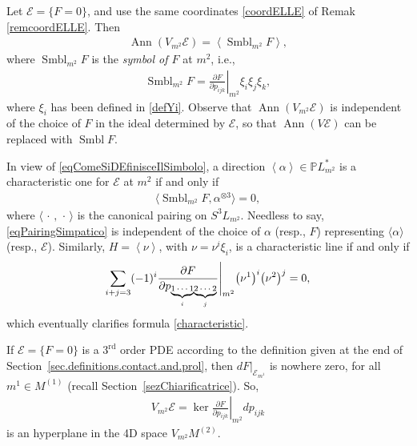 \documentclass[10pt,a4paper]{amsart}
\newcommand{\E}{\mathcal{E}}
\newcommand{\Ann}{\operatorname{Ann}}
\newcommand{\Span}[1]{\left\langle #1 \right\rangle}
\renewcommand{\P}{\mathbb{P}}
\newcommand{\Rd}{^\textrm{rd}}
\newcommand{\w}{\nu}
\newcommand{\elle}{H}
\numberwithin{equation}{section}
\begin{document}
\begin{Remark}\label{remSimboloSimboloso}
Let $\E=\{ F=0\}$, and use the same coordinates \eqref{coordELLE} of Remak \ref{remcoordELLE}. Then
 \begin{gather*}%
\Ann(V_{m^2}\E ) = \Span{ \operatorname{Smbl}_{m^2}{F} },
\end{gather*}
where $\operatorname{Smbl}_{m^2}{F}$ is the \emph{symbol of $F$} at $m^2$, i.e.,
\begin{gather}\label{simbcordF}
\operatorname{Smbl}_{m^2}{F}=\left.\frac{\partial F}{\partial p_{ijk}}\right|_{m^2}\xi_i\xi_j\xi_k,
\end{gather}
where $\xi_i$ has been def\/ined in \eqref{defYi}.
Observe that $\Ann(V_{m^2}\E ) $ is independent of the choice of $F$ in the ideal determined by $\E$, so that $\Ann(V\E)$ can be replaced with $\operatorname{Smbl} {F}$.
\end{Remark}

In view of \eqref{eqComeSiDEfinisceIlSimbolo}, a direction $\Span{\alpha}\in \P L_{m^2}^\ast$ is a characteristic one for $\E$ at $m^2$ if and only if
 \begin{gather}\label{eqPairingSimpatico}
\big\langle \operatorname{Smbl}_{m^2}{F}, \alpha^{\otimes 3} \big\rangle=0,
\end{gather}
where $\langle \,\cdot\, ,\, \cdot\, \rangle$ is the canonical pairing on $S^3L_{m^2}$. Needless to say, \eqref{eqPairingSimpatico} is independent of the choice of $\alpha$ (resp., $F$) representing $\langle\alpha\rangle$ (resp., $\E$). Similarly, $\elle=\Span{\w}$, with $\w=\w^i\xi_i$, is a characteristic line if and only if
\begin{gather*}
 \sum_{i+j=3} (-1)^i \frac{\partial F }{\partial p_{\text{\scriptsize $\underbrace{1\cdots 1}_{i}$} \text{\scriptsize $\underbrace{2\cdots 2}_{j}$}}} \Bigg|_{ {m}^{2}}\big(\w^1\big)^i\big(\w^2\big)^j =0,
\end{gather*}
which eventually clarif\/ies formula \eqref{characteristic}.

\begin{Remark}[coordinates of $V\E$]
If $\E=\{F=0\}$ is a $3\Rd$ order PDE according to the def\/inition given at the end of Section~\ref{sec.definitions.contact.and.prol}, then $dF|_{\E_{m^1}}$ is nowhere zero, for all $m^1\in M^{(1)}$ (recall Section~\ref{sezChiarificatrice}). So,
 \begin{gather*}%
V_{m^2}\E = \ker \left.\frac{\partial F}{\partial p_{ijk}}\right|_{m^2}dp_{ijk}
\end{gather*}
is an hyperplane in the 4D space $V_{m^2}M^{(2)}$.
\end{Remark}
\end{document}
